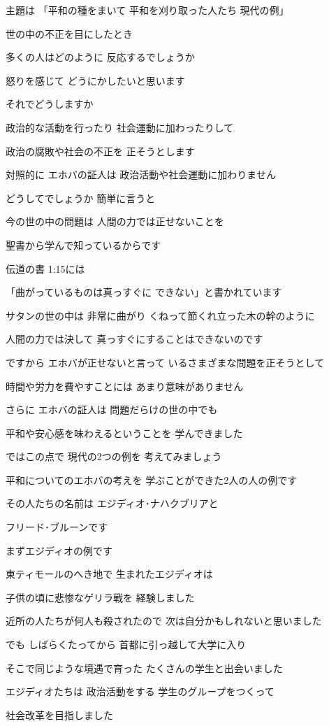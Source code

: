\documentclass[twocolumn]{jsarticle}
\begin{document}
主題は 「平和の種をまいて
平和を刈り取った人たち 現代の例」

世の中の不正を目にしたとき

多くの人はどのように
反応するでしょうか

怒りを感じて
どうにかしたいと思います

それでどうしますか

政治的な活動を行ったり
社会運動に加わったりして

政治の腐敗や社会の不正を
正そうとします

対照的に エホバの証人は
政治活動や社会運動に加わりません

どうしてでしょうか 簡単に言うと

今の世の中の問題は
人間の力では正せないことを

聖書から学んで知っているからです

伝道の書 1:15には

「曲がっているものは真っすぐに
できない」と書かれています

サタンの世の中は 非常に曲がり
くねって節くれ立った木の幹のように

人間の力では決して
真っすぐにすることはできないのです

ですから エホバが正せないと言って
いるさまざまな問題を正そうとして

時間や労力を費やすことには
あまり意味がありません

さらに エホバの証人は
問題だらけの世の中でも

平和や安心感を味わえるということを
学んできました

ではこの点で 現代の2つの例を
考えてみましょう

平和についてのエホバの考えを
学ぶことができた2人の人の例です

その人たちの名前は
エジディオ･ナハクブリアと

フリード･ブルーンです

まずエジディオの例です

東ティモールのへき地で
生まれたエジディオは

子供の頃に悲惨なゲリラ戦を
経験しました

近所の人たちが何人も殺されたので
次は自分かもしれないと思いました

でも しばらくたってから
首都に引っ越して大学に入り

そこで同じような境遇で育った
たくさんの学生と出会いました

エジディオたちは 政治活動をする
学生のグループをつくって

社会改革を目指しました
\end{document}

